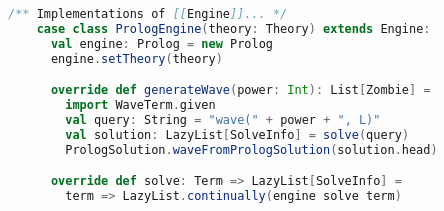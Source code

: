 \begin{lstlisting}[language=Scala, label=code:prolog-engine, caption=Integrazione del Prolog Engine.]
    /** Implementations of [[Engine]]... */
    case class PrologEngine(theory: Theory) extends Engine:
      val engine: Prolog = new Prolog
      engine.setTheory(theory)

      override def generateWave(power: Int): List[Zombie] =
        import WaveTerm.given
        val query: String = "wave(" + power + ", L)"
        val solution: LazyList[SolveInfo] = solve(query)
        PrologSolution.waveFromPrologSolution(solution.head)

      override def solve: Term => LazyList[SolveInfo] = 
        term => LazyList.continually(engine solve term)
\end{lstlisting}


